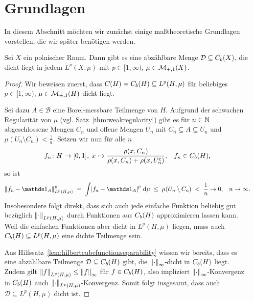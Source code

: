 \documentclass[../main/main.tex]{subfiles}
\begin{document}
	
	\section{Grundlagen}
	\label{Grundlagen}
	
	In diesem Abschnitt möchten wir zunächst einige maßtheoretische Grundlagen vorstellen, 
	die wir später benötigen werden. 

	\begin{Satz}
		\label{thm:Lp}
		Sei $X$ ein polnischer Raum. Dann gibt es eine abzählbare Menge 
		$\mathcal{D} \subseteq C_b(X)$, die dicht liegt in jedem 
		$L^p(X, \mu)$ mit $p \in [1, \infty)$, $\mu \in \mathcal{M}_{+,1}(X)$.
	\end{Satz}
	
	\begin{proof}
		Wir beweisen zuerst, dass $C(H) = C_b(H) \subseteq L^p(H, \mu)$ für beliebiges 
		$p \in [1, \infty)$, $\mu \in \mathcal{M}_{+,1}(H)$ dicht liegt. 
		
		Sei dazu $A \in \mathcal{B}$ eine Borel-messbare Teilmenge von $H$. 
		Aufgrund der schwachen Regularität von $\mu$ (vgl. Satz~\ref{thm:weakregularity}) 
		gibt es für $n \in \mathbb{N}$ abgeschlossene Mengen $C_n$ und offene Mengen 
		$U_n$ mit $C_n \subseteq A \subseteq U_n$ und 
		$\mu(U_n \setminus C_n) < \frac{1}{n}$. Setzen wir nun für alle $n$
		\[f_n \colon H \to [0, 1], \; x \mapsto \frac{\rho(x, C_n)}{\rho(x, C_n) + 
				\rho(x, U_n^\mathsf{c})}  \text{,} \quad f_n \in C_b(H) \text{,}\]
		so ist
		\[ \norm{f_n - \indfct_A}_{L^p(H, \mu)}^p \; = \; 
		\measureint{}{\abs{f_n - \indfct_A}^p}{\mu} \; \leq \; 
		\mu(U_n \setminus C_n) \; < \; \frac{1}{n} \to 0 \text{,} 
		\quad n \to \infty \text{.}\]
		Insobesondere folgt direkt, dass sich auch jede einfache Funktion 
		beliebig gut bezüglich $\left\lVert\cdot\right\rVert_{L^p(H, \mu)}$ durch Funktionen aus $C_b(H)$ 
		approximieren lassen kann. Weil die einfachen Funktionen aber dicht 
		in $L^p(H, \mu)$ liegen, muss auch $C_b(H) \subseteq L^p(H, \mu)$ eine 
		dichte Teilmenge sein.
		
		Aus Hilfssatz~\ref{lem:hilbertcubefunctionseparability} wissen wir 
		bereits, dass es eine abzählbare Teilmenge $\mathcal{D}\subseteq C_b(H)$ 
		gibt, die $\left\lVert\cdot\right\rVert_\infty$-dicht in $C_b(H)$ liegt. Zudem gilt 
		$\left\lVert f\right\rVert_{L^p(H, \mu)} \leq \left\lVert f\right\rVert_\infty$ für $f \in C_b(H)$, also impliziert 
		$\left\lVert\cdot\right\rVert_\infty$-Konvergenz in $C_b(H)$ auch $\left\lVert\cdot\right\rVert_{L^p(H, \mu)}$-Konvergenz. 
		Somit folgt insgesamt, dass auch $\mathcal{D} \subseteq L^p(H, \mu)$ dicht ist.
		

\end{proof}
\end{document}
